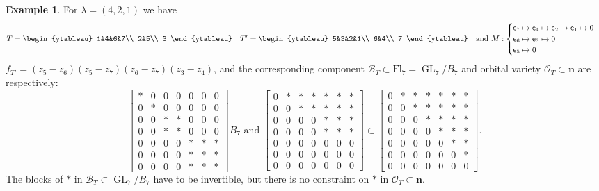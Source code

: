 \documentclass[11pt]{amsart}
\theoremstyle{definition}
\newtheorem{eg}[thm]{Example}
\numberwithin{equation}{section}
\newcommand{\fl}[1]{\mathrm{Fl}_{#1}}
\newcommand{\gl}{\operatorname{GL}}
\begin{document}
\begin{eg}
    For $\lambda=(4,2,1)$ we have
    $$T=\begin{ytableau}
        1&4&6&7\\
        2&5\\
        3
    \end{ytableau}\quad T'=\begin{ytableau}
        5&3&2&1\\
        6&4\\
        7
    \end{ytableau}\quad \text{and }M:\begin{cases}{\sf e}_7\mapsto {\sf e}_4\mapsto {\sf e}_2\mapsto {\sf e}_1\mapsto 0&\\
    {\sf e}_6\mapsto {\sf e}_3\mapsto 0\\
    {\sf e}_5\mapsto 0\end{cases}$$
    $f_{T'}=(z_5-z_6)(z_5-z_7)(z_6-z_7)(z_3-z_4)$, and the corresponding component $\mathcal{B}_T\subset \fl{7}=\gl_7/B_7$ and orbital variety $\mathcal{O}_T\subset \bm{n}$ are respectively:
    $$\begin{bmatrix}
    \ast&0&0&0&0&0&0\\
    0&\ast&0&0&0&0&0\\
    0&0&\ast&\ast&0&0&0\\
    0&0&\ast&\ast&0&0&0\\
    0&0&0&0&\ast&\ast&\ast\\
    0&0&0&0&\ast&\ast&\ast\\
    0&0&0&0&\ast&\ast&\ast\end{bmatrix}B_7\text{ and }\begin{bmatrix}0&\ast&\ast&\ast&\ast&\ast&\ast\\
    0&0&\ast&\ast&\ast&\ast&\ast\\
    0&0&0&\boxed{0}&\ast&\ast&\ast\\
    0&0&0&0&\ast&\ast&\ast\\
    0&0&0&0&0&\boxed{0}&\boxed{0}\\
    0&0&0&0&0&0&\boxed{0}\\
    0&0&0&0&0&0&0\end{bmatrix}\subset \begin{bmatrix}0&\ast&\ast&\ast&\ast&\ast&\ast\\
    0&0&\ast&\ast&\ast&\ast&\ast\\
    0&0&0&\ast&\ast&\ast&\ast\\
    0&0&0&0&\ast&\ast&\ast\\
    0&0&0&0&0&\ast&\ast\\
    0&0&0&0&0&0&\ast\\
    0&0&0&0&0&0&0\end{bmatrix}.$$
    The blocks of $\ast$ in $\mathcal{B}_T\subset \gl_{7}/B_7$ have to be invertible, but there is no constraint on $\ast$ in $\mathcal{O}_T\subset \bm{n}$.
\end{eg}
\end{document}
